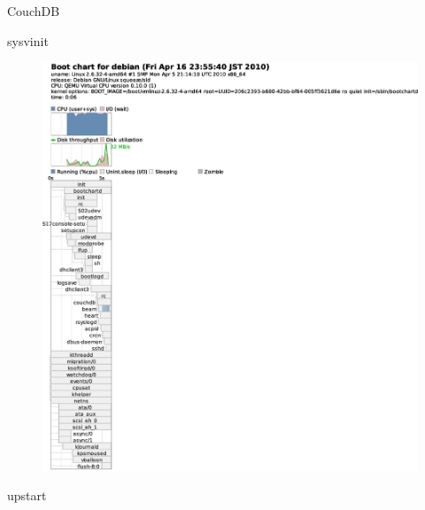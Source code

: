 \begin{frame}{CouchDB}
\begin{minipage}[t]{0.48\hsize}
sysvinit
\begin{figure}[h]
\begin{center}
\includegraphics[width=1.0\hsize]{image201004/upstart/sysvinit-couchdb-bootchart.eps}
\end{center}
\end{figure}
\end{minipage}
\begin{minipage}[t]{0.48\hsize}
upstart
\begin{figure}[h]
\begin{center}

\end{center}
\end{figure}
\end{minipage}
\end{frame}
